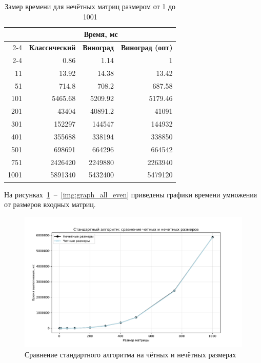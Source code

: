 \begin{table}[ht]
	\small
	\begin{center}
		\begin{threeparttable}
			\caption{Замер времени для нечётных матриц размером от 1 до 1001}
			\label{tbl:time_odd}
			\begin{tabular}{|r|r|r|r|}
				\hline
				& \multicolumn{3}{c|}{\bfseries Время, мс} \\
				\cline{2-4}
				\bfseries \makecell{Линейный размер} & \bfseries Классический & \bfseries Виноград & \bfseries Виноград (опт) \\
				\cline{2-4}
				\hline
				1 & 0.86 & 1.14 & 1 \\ 
				\hline 
				11 & 13.92 & 14.38 & 13.42 \\ 
				\hline 
				51 & 714.8 & 708.2 & 687.58 \\ 
				\hline 
				101 & 5465.68 & 5209.92 & 5179.46 \\ 
				\hline 
				201 & 43404 & 40891.2 & 41091 \\ 
				\hline 
				301 & 152297 & 144547 & 144932 \\ 
				\hline 
				401 & 355688 & 338194 & 338850 \\ 
				\hline 
				501 & 698691 & 664296 & 664542 \\ 
				\hline 
				751 & 2426420 & 2249880 & 2263940 \\ 
				\hline 
				1001 & 5891340 & 5432400 & 5479120 \\
				\hline
			\end{tabular}	
		\end{threeparttable}
	\end{center}
\end{table}

\clearpage

На рисунках~\ref{img:graph_std_odd_vs_even}~--~\ref{img:graph_all_even} приведены графики времени умножения от размеров входных матриц.

\begin{figure}[H]
	\hspace*{-2cm}
	\includegraphics[scale=0.8]{images/std_odd_vs_even.pdf}
	\caption{Сравнение стандартного алгоритма на чётных и нечётных размерах}
	\label{img:graph_std_odd_vs_even}
\end{figure}
\clearpage

